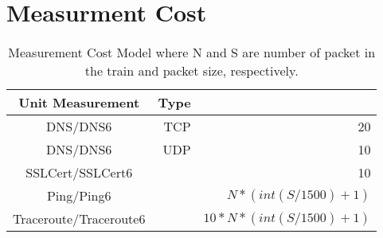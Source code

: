 \section{Measurment Cost}


\begin{table}[h] 

\hspace{2in}
\centering %
\begin{tabular}{c rr} %
\hline\hline %
Unit Measurement& Type \multicolumn{3}{c}{Cost} \\ [0.5ex] 
\hline %
DNS\slash DNS6 & TCP & 20\\ %
DNS\slash DNS6 & UDP & 10\\ 
SSLCert\slash SSLCert6 & & 10 \\
Ping\slash Ping6 & & $N * (int(S/1500)+1)$\\
Traceroute\slash Traceroute6 & & $ 10*N*(int(S/1500)+1)$\\
\hline %
\end{tabular} 
\caption{Measurement Cost Model where N and S are number of packet in the train and packet size, respectively.} %
\label{tab:hresult} 
\end{table} 
